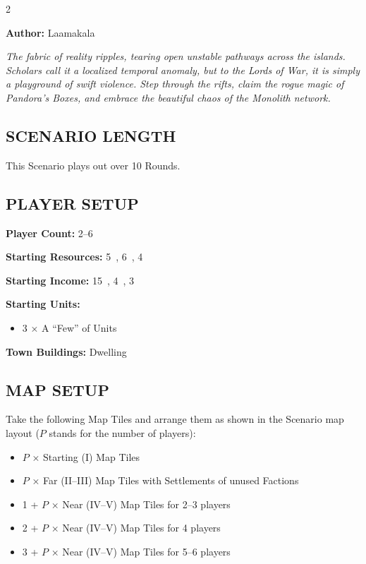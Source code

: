 
\begin{multicols*}{2}

\textbf{Author:} Laamakala

\textit{The fabric of reality ripples, tearing open unstable pathways across the islands.
Scholars call it a localized temporal anomaly, but to the Lords of War, it is simply a playground of swift violence.
Step through the rifts, claim the rogue magic of Pandora's Boxes, and embrace the beautiful chaos of the Monolith network.}

\subsection*{\MakeUppercase{Scenario Length}}
This Scenario plays out over 10 Rounds.

\subsection*{\MakeUppercase{Player Setup}}
\textbf{Player Count:} 2--6

\textbf{Starting Resources:} 5~, 6~, 4~

\textbf{Starting Income:} 15~, 4~, 3~

\textbf{Starting Units:}
\begin{itemize}
  \item 3 × A ``Few'' of  Units
\end{itemize}

\textbf{Town Buildings:}  Dwelling

\subsection*{\MakeUppercase{Map Setup}}

Take the following Map Tiles and arrange them as shown in the Scenario map layout ($P$ stands for the number of players):

\begin{itemize}
  \item $P$ × Starting (I) Map Tiles
  \item $P$ × Far (II--III) Map Tiles with Settlements of unused Factions
  \item 1 + $P$ × Near (IV--V) Map Tiles for 2--3 players
  \item 2 + $P$ × Near (IV--V) Map Tiles for 4 players
  \item 3 + $P$ × Near (IV--V) Map Tiles for 5--6 players
\end{itemize}


\end{multicols*}
